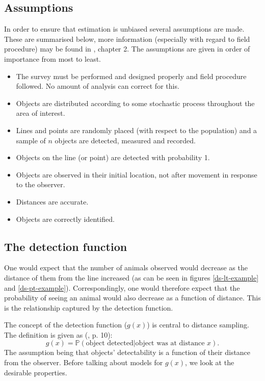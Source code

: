 \subsection{Assumptions}
In order to ensure that estimation is unbiased several assumptions are made. These are summarised below, more information (especially with regard to field procedure) may be found in , chapter 2. The assumptions are given in order of importance from most to least.
\begin{itemize}
	\item The survey must be performed and designed properly and field procedure followed. No amount of analysis can correct for this.
	\item Objects are distributed according to some stochastic process throughout the area of interest.
	\item Lines and points are randomly placed (with respect to the population) and a sample of $n$ objects are detected, measured and recorded.
	\item Objects on the line (or point) are detected with probability 1.
	\item Objects are observed in their initial location, not after movement in response to the observer.
	\item Distances are accurate.
	\item Objects are correctly identified.
\end{itemize}

\subsection{The detection function}
One would expect that the number of animals observed would decrease as the distance of them from the line increased (as can be seen in figures \ref{ds-lt-example} and \ref{ds-pt-example}). Correspondingly, one would therefore expect that the probability of seeing an animal would also decrease as a function of distance. This is the relationship captured by the detection function.

The concept of the detection function ($g(x)$) is central to distance sampling. The definition is given as (\cite{IDS}, p. 10):
\begin{equation*}
g(x)=\mathbb{P} (\text{object detected} | \text{object was at distance } x).
\end{equation*}
The assumption being that objects' detectability is a function of their distance from the observer. Before talking about models for $g(x)$, we look at the desirable properties.

